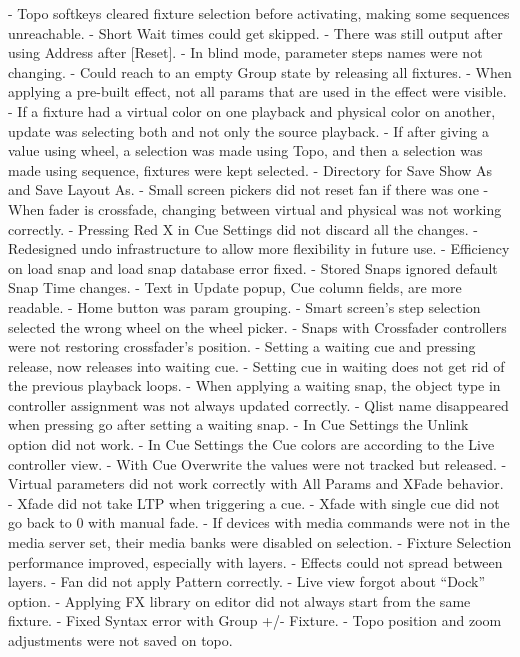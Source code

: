 \documentclass[
]{article}
\begin{document}
- Topo softkeys cleared fixture selection before activating, making some sequences unreachable.
- Short Wait times could get skipped.
- There was still output after using Address after {[}Reset{]}.
- In blind mode, parameter steps names were not changing.
- Could reach to an empty Group state by releasing all fixtures.
- When applying a pre-built effect, not all params that are used in the effect were visible.
- If a fixture had a virtual color on one playback and physical color on another, update was selecting both and not only the source playback.
- If after giving a value using wheel, a selection was made using Topo, and then a selection was made using sequence, fixtures were kept selected.
- Directory for Save Show As and Save Layout As.
- Small screen pickers did not reset fan if there was one
- When fader is crossfade, changing between virtual and physical was not working correctly.
- Pressing Red X in Cue Settings did not discard all the changes.
- Redesigned undo infrastructure to allow more flexibility in future use.
- Efficiency on load snap and load snap database error fixed.
- Stored Snaps ignored default Snap Time changes.
- Text in Update popup, Cue column fields, are more readable.
- Home button was param grouping.
- Smart screen's step selection selected the wrong wheel on the wheel picker.
- Snaps with Crossfader controllers were not restoring crossfader's position.
- Setting a waiting cue and pressing release, now releases into waiting cue.
- Setting cue in waiting does not get rid of the previous playback loops.
- When applying a waiting snap, the object type in controller assignment was not always updated correctly.
- Qlist name disappeared when pressing go after setting a waiting snap.
- In Cue Settings the Unlink option did not work.
- In Cue Settings the Cue colors are according to the Live controller view.
- With Cue Overwrite the values were not tracked but released.
- Virtual parameters did not work correctly with All Params and XFade behavior.
- Xfade did not take LTP when triggering a cue.
- Xfade with single cue did not go back to 0 with manual fade.
- If devices with media commands were not in the media server set, their media banks were disabled on selection.
- Fixture Selection performance improved, especially with layers.
- Effects could not spread between layers.
- Fan did not apply Pattern correctly.
- Live view forgot about ``Dock'' option.
- Applying FX library on editor did not always start from the same fixture.
- Fixed Syntax error with Group +/- Fixture.
- Topo position and zoom adjustments were not saved on topo.
\end{document}
